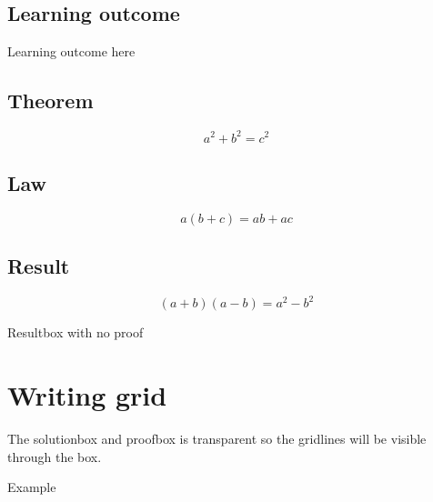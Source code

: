 \documentclass[11pt,a4paper,twoside]{report}
\begin{document}
\subsection{Learning outcome}

\begin{outcome}
  Learning outcome here
\end{outcome}

\subsection{Theorem}

\begin{theorem}[Pythagoras']
  $$a^2+b^2=c^2$$
\end{theorem}

\subsection{Law}

\begin{law}[Distributive]
  $$a(b+c)=ab+ac$$
\end{law}

\subsection{Result}

\begin{result}
  $$(a+b)(a-b)=a^2-b^2$$
\end{result}

\begin{resultbox}
  Resultbox with no proof
\end{resultbox}

\section{Writing grid}

\GridOn


\begin{note}
  The solutionbox and proofbox is transparent so the gridlines will be visible through the box.
\end{note}

\begin{example}{}
  Example
\end{example}
\end{document}
